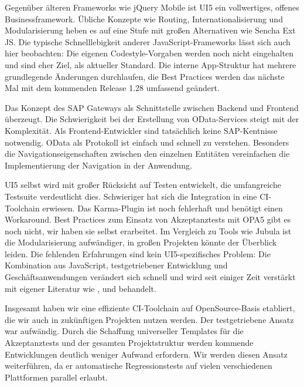 Gegenüber älteren Frameworks wie jQuery Mobile ist UI5 ein vollwertiges, offenes Businessframework. Übliche Konzepte wie Routing, Internationalisierung und Modularisierung heben es auf eine Stufe mit großen Alternativen wie Sencha Ext JS. Die typische Schnelllebigkeit anderer JavaScript-Frameworks lässt sich auch hier beobachten: Die eigenen Codestyle-Vorgaben werden noch nicht eingehalten und sind eher Ziel, als aktueller Standard. Die interne App-Struktur hat mehrere grundlegende Änderungen durchlaufen, die Best Practices werden das nächste Mal mit dem kommenden Release 1.28 umfassend geändert.

Das Konzept des SAP Gateways als Schnittstelle zwischen Backend und Frontend überzeugt. Die Schwierigkeit bei der Erstellung von OData-Services steigt mit der Komplexität. Als Frontend-Entwickler sind tatsächlich keine SAP-Kentnisse notwendig. OData als Protokoll ist einfach und schnell zu verstehen. Besonders die Navigationseigenschaften zwischen den einzelnen Entitäten vereinfachen die Implementierung der Navigation in der Anwendung.

UI5 selbst wird mit großer Rücksicht auf Testen entwickelt, die umfangreiche Testsuite verdeutlicht dies. Schwieriger hat sich die Integration in eine CI-Toolchain erwiesen. Das Karma-Plugin ist noch fehlerhaft und benötigt einen Workaround. Best Practices zum Einsatz von Akzeptanztests mit OPA5 gibt es noch nicht, wir haben sie selbst erarbeitet. Im Vergleich zu Tools wie Jubula ist die Modularisierung aufwändiger, in großen Projekten könnte der Überblick leiden. Die fehlenden Erfahrungen sind kein UI5-spezifisches Problem: Die Kombination aus JavaScript, testgetriebener Entwicklung und Geschäftsanwendungen verändert sich schnell und wird seit einiger Zeit verstärkt mit eigener Literatur wie \cite{Fain2014}, \cite{Wrobel2015} und \cite{Springer2015} behandelt.

Insgesamt haben wir eine effiziente CI-Toolchain auf OpenSource-Basis etabliert, die wir auch in zukünftigen Projekten nutzen werden. Der testgetriebene Ansatz war aufwändig. Durch die Schaffung universeller Templates für die Akzeptanztests und der gesamten Projektstruktur werden kommende Entwicklungen deutlich weniger Aufwand erfordern. Wir werden diesen Ansatz weiterführen, da er automatische Regressionstests auf vielen verschiedenen Plattformen parallel erlaubt.
